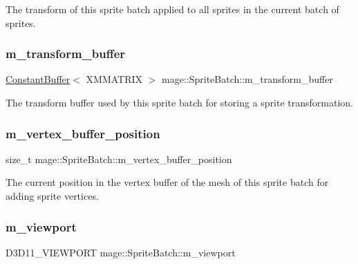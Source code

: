 The transform of this sprite batch applied to all sprites in the current batch of sprites. \hypertarget{classmage_1_1_sprite_batch_ac8ff5a2d9956b4a33cb1f41310abf129}{}\label{classmage_1_1_sprite_batch_ac8ff5a2d9956b4a33cb1f41310abf129} 
\subsubsection{\texorpdfstring{m\+\_\+transform\+\_\+buffer}{m\_transform\_buffer}}
{\footnotesize\ttfamily \hyperlink{structmage_1_1_constant_buffer}{Constant\+Buffer}$<$ X\+M\+M\+A\+T\+R\+IX $>$ mage\+::\+Sprite\+Batch\+::m\+\_\+transform\+\_\+buffer\hspace{0.3cm}{\ttfamily [private]}}

The transform buffer used by this sprite batch for storing a sprite transformation. \hypertarget{classmage_1_1_sprite_batch_afd6af84ab6728bfa907e6b8153357585}{}\label{classmage_1_1_sprite_batch_afd6af84ab6728bfa907e6b8153357585} 
\subsubsection{\texorpdfstring{m\+\_\+vertex\+\_\+buffer\+\_\+position}{m\_vertex\_buffer\_position}}
{\footnotesize\ttfamily size\+\_\+t mage\+::\+Sprite\+Batch\+::m\+\_\+vertex\+\_\+buffer\+\_\+position\hspace{0.3cm}{\ttfamily [private]}}

The current position in the vertex buffer of the mesh of this sprite batch for adding sprite vertices. \hypertarget{classmage_1_1_sprite_batch_a3029ab1ee01ccfc69fef88eb78d5bfc0}{}\label{classmage_1_1_sprite_batch_a3029ab1ee01ccfc69fef88eb78d5bfc0} 
\subsubsection{\texorpdfstring{m\+\_\+viewport}{m\_viewport}}
{\footnotesize\ttfamily D3\+D11\+\_\+\+V\+I\+E\+W\+P\+O\+RT mage\+::\+Sprite\+Batch\+::m\+\_\+viewport\hspace{0.3cm}{\ttfamily [private]}}

